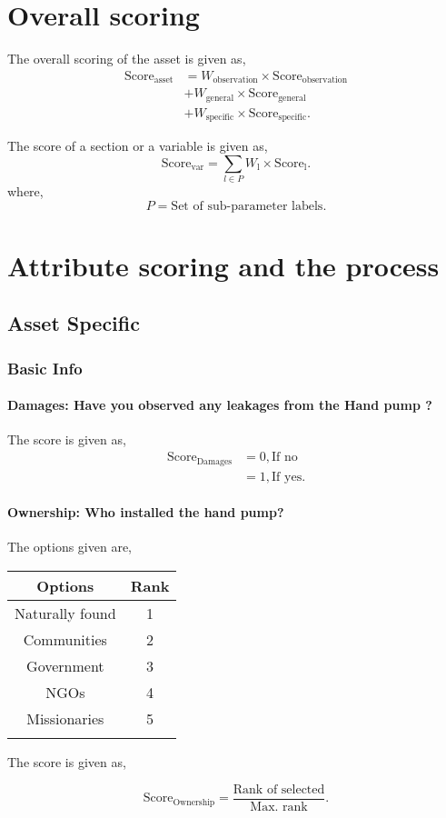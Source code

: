 \documentclass[oneside,twocolumn]{article}
\newcommand{\tsub}[2]{\text{#1}_{\text{#2}}}
\newcommand{\tsubb}[2]{#1_{\text{#2}}}
\newcommand{\dsub}[2]{\dfrac{\text{#1}}{\text{#2}}}
\newcommand{\singsel}[1]
{
	\[
		\tsub{Score}{#1} = \dsub{Rank of selected}{Max. rank}.
	\]
}
\newenvironment{ttable}
{
\begin{center}
\begin{tabular}{c|c}
\hline
}
{
\\ \hline
\end{tabular}
\end{center}
}
\begin{document}
\section{Overall scoring}
The overall scoring of the asset is given as,
\begin{align*}
	\tsub{Score}{asset} &= \tsubb{W}{observation} \times \tsub{Score}{observation} \\
	&+ \tsubb{W}{general} \times \tsub{Score}{general} \\
	&+ \tsubb{W}{specific} \times \tsub{Score}{specific}.
\end{align*}

The score of a section or a variable is given as,
\[
	\tsub{Score}{var} = \sum_{l \in P} \tsubb{W}{l} \times \tsub{Score}{l}.
\]
where,
\[
	P = \text{Set of sub-parameter labels.}
\]
\section{Attribute scoring and the
process}
\subsection{Asset Specific}
\subsubsection{Basic Info}

\paragraph{Damages: 
Have you observed any leakages from the Hand pump ? 
}

The score is given as,
\begin{align*}
\tsub{Score}{Damages} &= 0, \text{If no} \\
        &= 1, \text{If yes}.
\end{align*}
\paragraph{Ownership: Who installed the hand pump? 
}

The options given are,
\begin{ttable}
Options & Rank \\ \hline
Naturally found & 1 \\
Communities  & 2 \\
Government & 3 \\
NGOs & 4 \\
Missionaries & 5 \\
\hline
\end{ttable}
The score is given as,
\singsel{Ownership}
\end{document}
